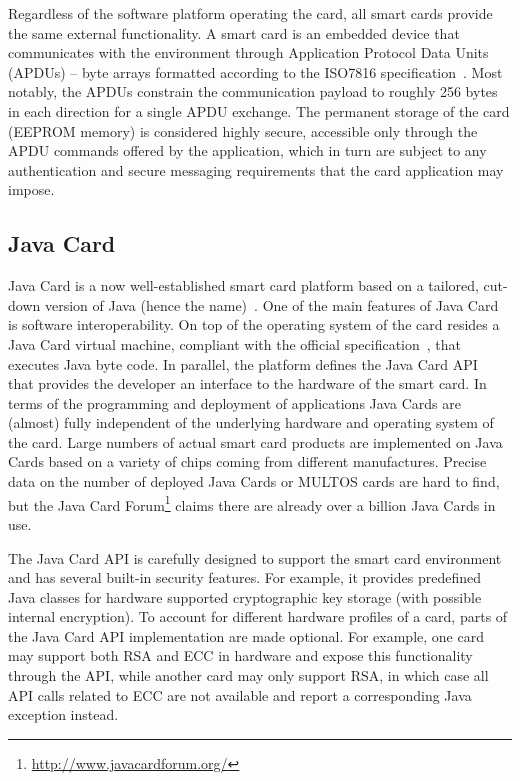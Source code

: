 Regardless of the software platform operating the card, all smart cards provide
the same external functionality. A smart card is an embedded device that
communicates with the environment through Application Protocol Data Units
(APDUs) -- byte arrays formatted according to the ISO7816
specification~\cite{ISO7816_4}. Most notably, the APDUs constrain the
communication payload to roughly 256 bytes in each direction for a single APDU
exchange. The permanent storage of the card (EEPROM memory) is considered
highly secure, accessible only through the APDU commands offered by the
application, which in turn are subject to any authentication and secure
messaging requirements that the card application may impose.

\subsection{Java Card}\label{sec:javacard}

Java Card is a now well-established smart card platform based on a
tailored, cut-down version of Java (hence the name)~\cite{Chen00}. One
of the main features of Java Card is software interoperability. On top
of the operating system of the card resides a Java Card virtual
machine, compliant with the official specification~\cite{jcvm222}, that
executes Java byte code. In parallel, the platform defines
the Java Card API~\cite{jcapi222} that provides the developer an interface
to the hardware of the smart card.
In terms of the programming and deployment of applications
Java Cards are (almost) fully independent of the underlying hardware
and operating system of the card. Large numbers of actual smart card
products are implemented on Java Cards based on a variety of chips
coming from different manufactures. Precise data on the number of deployed
Java Cards or MULTOS cards are hard to find, but the
Java Card Forum\footnote{\url{http://www.javacardforum.org/}}
claims there are already over a billion Java Cards in use.


The Java Card API is carefully designed to support the smart card
environment and has several built-in security features. For example,
it provides predefined Java classes for hardware supported
cryptographic key storage (with possible internal encryption). To
account for different hardware profiles of a card, parts of the Java
Card API implementation are made optional. For example, one card may
support both RSA and ECC in hardware and expose this functionality
through the API, while another card may only support RSA, in which
case all API calls related to ECC are not available and report a
corresponding Java exception instead.

